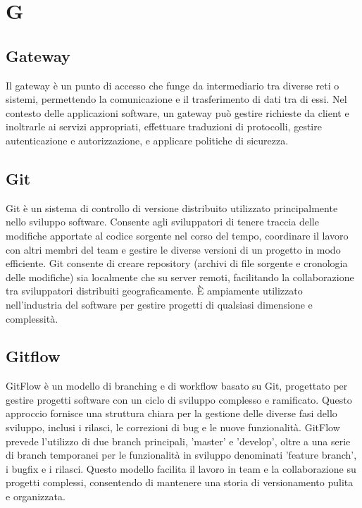 \section*{G} 
\subsection*{Gateway} 
Il gateway è un punto di accesso che funge da intermediario tra diverse reti o sistemi, permettendo la comunicazione e il trasferimento di dati tra di essi. Nel contesto delle applicazioni software, un gateway può gestire richieste da client e inoltrarle ai servizi appropriati, effettuare traduzioni di protocolli, gestire autenticazione e autorizzazione, e applicare politiche di sicurezza.
\subsection*{Git} 
Git è un sistema di controllo di versione distribuito utilizzato principalmente nello sviluppo software. Consente agli sviluppatori di tenere traccia delle modifiche apportate al codice sorgente nel corso del tempo, coordinare il lavoro con altri membri del team e gestire le diverse versioni di un progetto in modo efficiente. Git consente di creare repository (archivi di file sorgente e cronologia delle modifiche) sia localmente che su server remoti, facilitando la collaborazione tra sviluppatori distribuiti geograficamente. È ampiamente utilizzato nell'industria del software per gestire progetti di qualsiasi dimensione e complessità.
\subsection*{Gitflow} 
GitFlow è un modello di branching e di workflow basato su Git, progettato per gestire progetti software con un ciclo di sviluppo complesso e ramificato. Questo approccio fornisce una struttura chiara per la gestione delle diverse fasi dello sviluppo, inclusi i rilasci, le correzioni di bug e le nuove funzionalità. GitFlow prevede l'utilizzo di due branch principali, 'master' e 'develop', oltre a una serie di branch temporanei per le funzionalità in sviluppo denominati 'feature branch', i bugfix e i rilasci. Questo modello facilita il lavoro in team e la collaborazione su progetti complessi, consentendo di mantenere una storia di versionamento pulita e organizzata.
